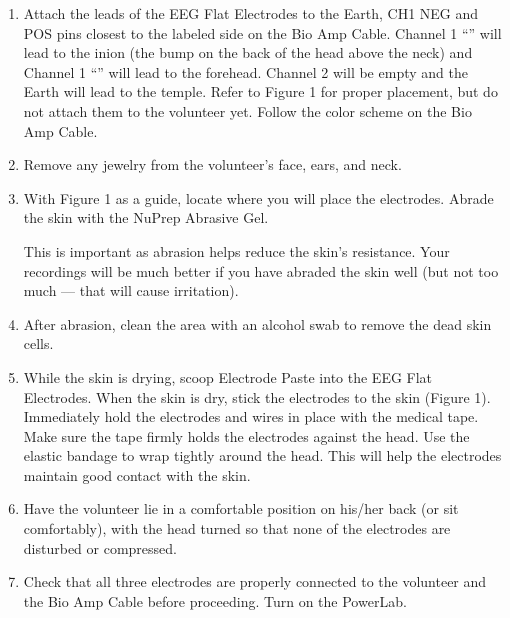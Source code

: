 \documentclass[letterpaper,10pt,english]{jupyterBook}
\begin{document}
\sphinxAtStartPar
{}

\sphinxAtStartPar
{}
\begin{enumerate}
%
\setcounter{enumi}{2}
\item {} 
\sphinxAtStartPar
Attach the leads of the EEG Flat Electrodes to the Earth, CH1 NEG and POS pins closest to the labeled side on the Bio Amp Cable. Channel 1 “” will lead to the inion (the bump on the back of the head above the neck) and Channel 1 “” will lead to the forehead. Channel 2 will be empty and the Earth will lead to the temple. Refer to Figure 1 for proper placement, but do not attach them to the volunteer yet. Follow the color scheme on the Bio Amp Cable.

\item {} 
\sphinxAtStartPar
Remove any jewelry from the volunteer’s face, ears, and neck.

\item {} 
\sphinxAtStartPar
With Figure 1 as a guide, locate where you will place the electrodes. Abrade the skin with the NuPrep Abrasive Gel.

\sphinxAtStartPar
{} This is important as abrasion helps reduce the skin’s resistance. Your recordings will be much better if you have abraded the skin well (but not too much — that will cause irritation).

\item {} 
\sphinxAtStartPar
After abrasion, clean the area with an alcohol swab to remove the dead skin cells.

\item {} 
\sphinxAtStartPar
While the skin is drying, scoop Electrode Paste into the EEG Flat Electrodes. When the skin is dry, stick the electrodes to the skin (Figure 1). Immediately hold the electrodes and wires in place with the medical tape. Make sure the tape firmly holds the electrodes against the head. Use the elastic bandage to wrap tightly around the head. This will help the electrodes maintain good contact with the skin.

\item {} 
\sphinxAtStartPar
Have the volunteer lie in a comfortable position on his/her back (or sit comfortably), with the head turned so that none of the electrodes are disturbed or compressed.

\item {} 
\sphinxAtStartPar
Check that all three electrodes are properly connected to the volunteer and the Bio Amp Cable before proceeding. Turn on the PowerLab.

\end{enumerate}
\end{document}
